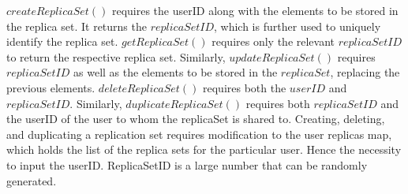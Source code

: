 \documentclass[conference]{IEEEtran}
\begin{document}
$createReplicaSet()$ requires the userID along with the elements to be stored in the replica set. It returns the $replicaSetID$, which is further used to uniquely identify the replica set. $getReplicaSet()$ requires only the relevant $replicaSetID$ to return the respective replica set. Similarly, $updateReplicaSet()$ requires $replicaSetID$ as well as the elements to be stored in the $replicaSet$, replacing the previous elements. $deleteReplicaSet()$ requires both the $userID$ and $replicaSetID$. Similarly, $duplicateReplicaSet()$ requires both $replicaSetID$ and the userID of the user to whom the replicaSet is shared to. Creating, deleting, and duplicating a replication set requires modification to the user replicas map, which holds the list of the replica sets for the particular user. Hence the necessity to input the userID. ReplicaSetID is a large number that can be randomly generated.
\end{document}
